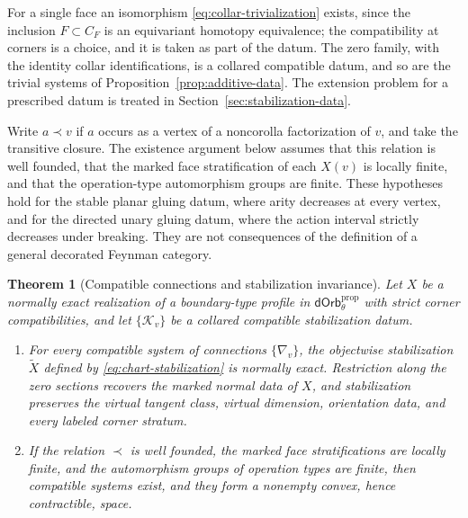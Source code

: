 \documentclass[11pt,letterpaper,twoside]{article}
\theoremstyle{plain}
\newtheorem{theorem}{Theorem}[section]
\theoremstyle{definition}
\theoremstyle{remark}
\newcommand{\dOrb}{\mathsf{dOrb}}
\begin{document}
For a single face an isomorphism \eqref{eq:collar-trivialization} exists, since the inclusion \(F\subset C_F\) is an equivariant homotopy equivalence; the compatibility at corners is a choice, and it is taken as part of the datum.  The zero family, with the identity collar identifications, is a collared compatible datum, and so are the trivial systems of Proposition~\ref{prop:additive-data}.  The extension problem for a prescribed datum is treated in Section~\ref{sec:stabilization-data}.

Write \(a\prec v\) if \(a\) occurs as a vertex of a noncorolla factorization of \(v\), and take the transitive closure.  The existence argument below assumes that this relation is well founded, that the marked face stratification of each \(X(v)\) is locally finite, and that the operation-type automorphism groups are finite.  These hypotheses hold for the stable planar gluing datum, where arity decreases at every vertex, and for the directed unary gluing datum, where the action interval strictly decreases under breaking.  They are not consequences of the definition of a general decorated Feynman category.

\begin{theorem}[Compatible connections and stabilization invariance]\label{thm:stabilization-normal}
Let \(X\) be a normally exact realization of a boundary-type profile in \(\dOrb_\theta^{\mathrm{prop}}\) with strict corner compatibilities, and let \(\{\mathcal K_v\}\) be a collared compatible stabilization datum.
\begin{enumerate}
\item For every compatible system of connections \(\{\nabla_v\}\), the objectwise stabilization \(\widetilde X\) defined by \eqref{eq:chart-stabilization} is normally exact.  Restriction along the zero sections recovers the marked normal data of \(X\), and stabilization preserves the virtual tangent class, virtual dimension, orientation data, and every labeled corner stratum.
\item If the relation \(\prec\) is well founded, the marked face stratifications are locally finite, and the automorphism groups of operation types are finite, then compatible systems exist, and they form a nonempty convex, hence contractible, space.
\end{enumerate}
\end{theorem}
\end{document}
